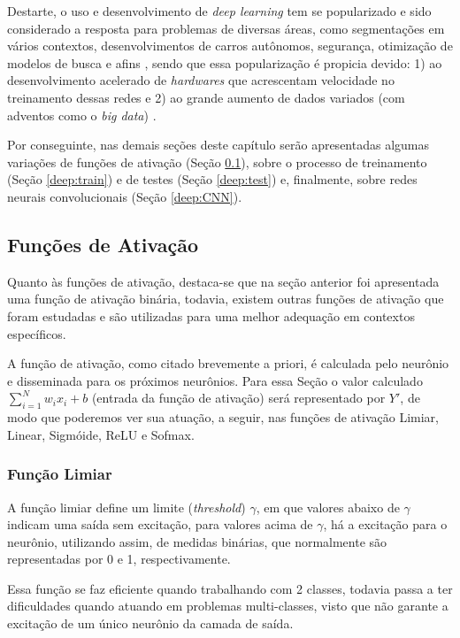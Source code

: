 Destarte, o uso e desenvolvimento de \textit{deep learning} tem se popularizado e sido considerado a resposta para problemas de diversas áreas, como segmentações em vários contextos, desenvolvimentos de carros autônomos, segurança, otimização de modelos de busca e afins \citep{Ghosh2019}, sendo que essa popularização é propicia devido: 1) ao desenvolvimento acelerado de \textit{hardwares} que acrescentam velocidade no treinamento dessas redes e 2) ao grande aumento de dados variados (com adventos como o \textit{big data}) \citep{Szegedy2015, ponti2018funciona}.

Por conseguinte, nas demais seções deste capítulo serão apresentadas algumas variações de funções de ativação (Seção \ref{deep:activation}), sobre o processo de treinamento (Seção \ref{deep:train}) e de testes (Seção \ref{deep:test}) e, finalmente, sobre redes neurais convolucionais (Seção \ref{deep:CNN}).


\subsection{Funções de Ativação}
\label{deep:activation}

Quanto às funções de ativação, destaca-se que na seção anterior foi apresentada uma função de ativação binária, todavia, existem outras funções de ativação que foram estudadas e são utilizadas para uma melhor adequação em contextos específicos.

A função de ativação, como citado brevemente a priori, é calculada pelo neurônio e disseminada para os próximos neurônios.  Para essa Seção o valor calculado $\sum_{i = 1}^{N} w_ix_i +b$ (entrada da função de ativação) será representado por $Y'$, de modo que poderemos ver sua atuação, a seguir, nas funções de ativação Limiar, Linear, Sigmóide, ReLU e Sofmax.


\subsubsection{Função Limiar}
\label{deep:limiar}
A função limiar define um limite (\textit{threshold}) $\gamma$, em que valores abaixo de $\gamma$ indicam uma saída sem excitação, para valores acima de $\gamma$, há a excitação para o neurônio, utilizando assim, de medidas binárias, que normalmente são representadas por 0 e 1, respectivamente.

Essa função se faz eficiente quando trabalhando com 2 classes, todavia passa a ter dificuldades quando atuando em problemas multi-classes, visto que não garante a excitação de um único neurônio da camada de saída.

